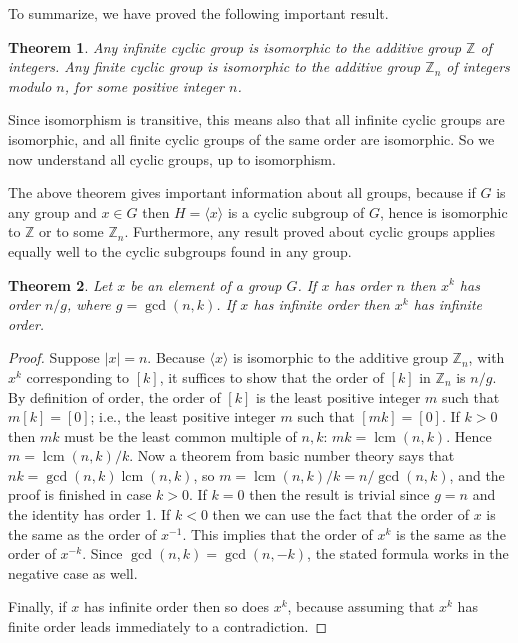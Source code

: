 \documentclass[11pt]{article}
\newtheorem{thm}{Theorem}[section]
\theoremstyle{definition}
\newcommand{\Z}{\mathbb{Z}} %
\newcommand{\gen}[1]{\langle #1 \rangle}
\newcommand{\lcm}{\operatorname{lcm}}
\begin{document}
To summarize, we have proved the following important result. 

\begin{thm}
  Any infinite cyclic group is isomorphic to the additive group $\Z$
  of integers. Any finite cyclic group is isomorphic to the additive
  group $\Z_n$ of integers modulo $n$, for some positive integer $n$.
\end{thm}

Since isomorphism is transitive, this means also that all infinite
cyclic groups are isomorphic, and all finite cyclic groups of the same
order are isomorphic. So we now understand all cyclic groups, up to
isomorphism. 

The above theorem gives important information about all groups,
because if $G$ is any group and $x \in G$ then $H = \gen{x}$ is a
cyclic subgroup of $G$, hence is isomorphic to $\Z$ or to some $\Z_n$.
Furthermore, any result proved about cyclic groups applies equally
well to the cyclic subgroups found in any group.

\begin{thm}\label{thm:order-x^k}
  Let $x$ be an element of a group $G$. If $x$ has order $n$ then
  $x^k$ has order $n/g$, where $g = \gcd(n,k)$. If $x$ has
  infinite order then $x^k$ has infinite order.
\end{thm}

\begin{proof}
Suppose $|x|=n$. Because $\gen{x}$ is isomorphic to the additive group
$\Z_n$, with $x^k$ corresponding to $[k]$, it suffices to show that
the order of $[k]$ in $\Z_n$ is $n/g$. By definition of order, the
order of $[k]$ is the least positive integer $m$ such that $m[k] =
[0]$; i.e., the least positive integer $m$ such that $[mk] = [0]$. If
$k>0$ then $mk$ must be the least common multiple of $n,k$: $mk =
\lcm(n,k)$. Hence $m = \lcm(n,k)/k$. Now a theorem from basic number
theory says that $nk = \gcd(n,k) \lcm(n,k)$, so $m = \lcm(n,k)/k =
n/\gcd(n,k)$, and the proof is finished in case $k>0$. If $k=0$ then
the result is trivial since $g=n$ and the identity has order 1. If
$k<0$ then we can use the fact that the order of $x$ is the same as
the order of $x^{-1}$.  This implies that the order of $x^k$ is the
same as the order of $x^{-k}$. Since $\gcd(n,k) = \gcd(n,-k)$, the
stated formula works in the negative case as well.

Finally, if $x$ has infinite order then so does $x^k$, because
assuming that $x^k$ has finite order leads immediately to a
contradiction.
\end{proof}
\end{document}
